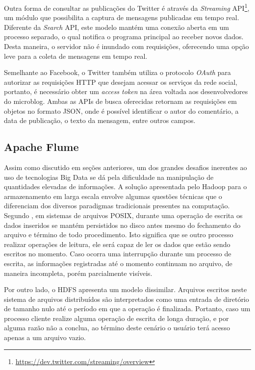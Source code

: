 Outra forma de consultar as publicações do Twitter é através da \textit{Streaming} API\footnote{\url{https://dev.twitter.com/streaming/overview}}, um módulo que possibilita a captura de mensagens publicadas em tempo real. Diferente da \textit{Search} API, este modelo mantém uma conexão aberta em um processo separado, o qual notifica o programa principal ao receber novos dados. Desta maneira, o servidor não é inundado com requisições, oferecendo uma opção leve para a coleta de mensagens em tempo real.

Semelhante ao Facebook, o Twitter também utiliza o protocolo \textit{OAuth} para autorizar as requisições HTTP que desejam acessar os serviços da rede social, portanto, é necessário obter um \textit{access token} na área voltada aos desenvolvedores do microblog. Ambas as APIs de busca oferecidas retornam as requisições em objetos no formato JSON, onde é possível identificar o autor do comentário, a data de publicação, o texto da mensagem, entre outros campos.

\subsection{Apache Flume}

Assim como discutido em seções anteriores, um dos grandes desafios inerentes ao uso de tecnologias Big Data se dá pela dificuldade na manipulação de quantidades elevadas de informações. A solução apresentada pelo Hadoop para o armazenamento em larga escala envolve algumas questões técnicas que o diferenciam dos diversos paradigmas tradicionais presentes na computação. Segundo , em sistemas de arquivos POSIX, durante uma operação de escrita os dados inseridos se mantém persistidos no disco antes mesmo do fechamento do arquivo e término de todo procedimento. Isto significa que se outro processo realizar operações de leitura, ele será capaz de ler os dados que estão sendo escritos no momento. Caso ocorra uma interrupção durante um processo de escrita, as informações registradas até o momento continuam no arquivo, de maneira incompleta, porém parcialmente visíveis.

Por outro lado, o HDFS apresenta um modelo dissimilar. Arquivos escritos neste sistema de arquivos distribuídos são interpretados como uma entrada de diretório de tamanho nulo até o período em que a operação é finalizada. Portanto, caso um processo cliente realize alguma operação de escrita de longa duração, e por alguma razão não a conclua, ao término deste cenário o usuário terá acesso apenas a um arquivo vazio.

